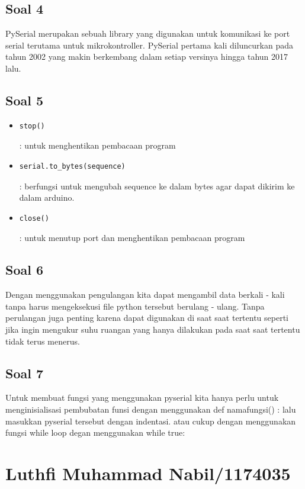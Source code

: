 	\subsection{Soal 4}
	PySerial merupakan sebuah library yang digunakan untuk komunikasi ke port serial terutama untuk mikrokontroller. PySerial pertama kali diluncurkan pada tahun 2002 yang makin berkembang dalam setiap versinya hingga tahun 2017 lalu.

	\subsection{Soal 5}
		\begin{itemize}
			\item \begin{verbatim}stop()\end{verbatim} : untuk menghentikan pembacaan program
			\item \begin{verbatim}serial.to_bytes(sequence)\end{verbatim} : berfungsi untuk mengubah sequence ke dalam bytes agar dapat dikirim ke dalam arduino.
			\item \begin{verbatim}close()\end{verbatim} : untuk menutup port dan menghentikan pembacaan program
		\end{itemize}

	\subsection{Soal 6}
	Dengan menggunakan pengulangan kita dapat mengambil data berkali - kali tanpa harus mengeksekusi file python tersebut berulang - ulang. Tanpa perulangan juga penting karena dapat digunakan di saat saat tertentu seperti jika ingin mengukur suhu ruangan yang hanya dilakukan pada saat saat tertentu tidak terus menerus.

	\subsection{Soal 7}
	Untuk membuat fungsi yang menggunakan pyserial kita hanya perlu untuk menginisialisasi pembubatan funsi dengan menggunakan def namafungsi() : lalu masukkan pyserial tersebut dengan indentasi. atau cukup dengan menggunakan fungsi while loop degan menggunakan while true:
	
\section{Luthfi Muhammad Nabil/1174035}
